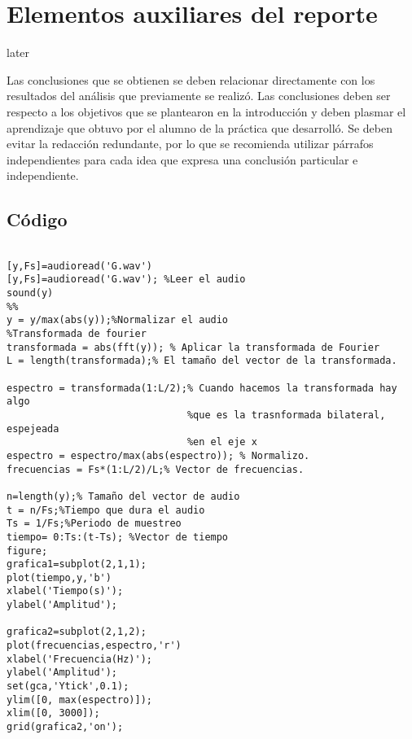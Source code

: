 \documentclass[times,5p, twocolumn]{elsarticle}
\begin{document}
\section{Elementos auxiliares del reporte}




later

\cite{Yeadon} Las conclusiones que se obtienen se deben relacionar directamente con los resultados del análisis que previamente se realizó. Las conclusiones deben ser respecto a los objetivos que se plantearon en la introducción y deben plasmar el aprendizaje que obtuvo por el alumno de la práctica que desarrolló. Se deben evitar la redacción redundante, por lo que se recomienda utilizar párrafos independientes para cada idea que expresa una conclusión particular e independiente.
















\subsection{Código}

\begin{lstlisting}[language=ListCpp,
caption={Código \LaTeX para insertar código en C/C++},
label = {codigo_1}]

[y,Fs]=audioread('G.wav')
[y,Fs]=audioread('G.wav'); %Leer el audio
sound(y)
%% 
y = y/max(abs(y));%Normalizar el audio
%Transformada de fourier
transformada = abs(fft(y)); % Aplicar la transformada de Fourier
L = length(transformada);% El tamaño del vector de la transformada.

espectro = transformada(1:L/2);% Cuando hacemos la transformada hay algo
                               %que es la trasnformada bilateral, espejeada
                               %en el eje x
espectro = espectro/max(abs(espectro)); % Normalizo.
frecuencias = Fs*(1:L/2)/L;% Vector de frecuencias.

n=length(y);% Tamaño del vector de audio
t = n/Fs;%Tiempo que dura el audio
Ts = 1/Fs;%Periodo de muestreo
tiempo= 0:Ts:(t-Ts); %Vector de tiempo
figure;
grafica1=subplot(2,1,1);
plot(tiempo,y,'b')
xlabel('Tiempo(s)');
ylabel('Amplitud');

grafica2=subplot(2,1,2);
plot(frecuencias,espectro,'r')
xlabel('Frecuencia(Hz)');
ylabel('Amplitud');
set(gca,'Ytick',0.1);
ylim([0, max(espectro)]);
xlim([0, 3000]);
grid(grafica2,'on');


\end{lstlisting}


	
\end{document}
